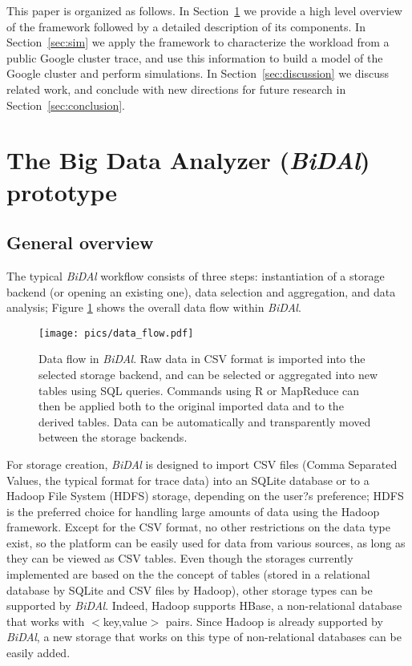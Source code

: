 \documentclass{article}
\begin{document}
This paper is organized as follows. In Section~\ref{sec:bidal} we provide a high level overview of the framework followed by a detailed description of its components. In Section~\ref{sec:sim} we apply the framework to characterize the workload from a public Google cluster trace, and use this information to build a model of the Google cluster and perform simulations. In Section~\ref{sec:discussion} we discuss related work, and conclude with new directions for future research in Section~\ref{sec:conclusion}.



\section{The Big Data Analyzer (\emph{BiDAl}) prototype}
\label{sec:bidal}

\subsection{General overview}

The typical \emph{BiDAl} workflow consists of three steps: instantiation of a storage backend (or opening an existing one), data selection and aggregation, and data analysis; Figure \ref{fig:data_flow} shows the overall data flow within \emph{BiDAl}. 

\begin{figure}[ht]
\centering
  \texttt{[image: pics/data\_flow.pdf]}
\caption{Data flow in \emph{BiDAl}. Raw data in CSV format is imported into the selected storage backend, and can be selected or aggregated into new tables using SQL queries. Commands using R or MapReduce can then be applied both to the original imported data and to the derived tables. Data can be automatically and transparently moved between the storage backends.}
\label{fig:data_flow}       
\end{figure}


For storage creation, \emph{BiDAl} is designed to import CSV files (Comma Separated Values, the typical format for trace data) into an SQLite database or to a Hadoop File System (HDFS) storage, depending on the user?s preference; HDFS is the preferred choice for handling large amounts of data using the Hadoop framework. Except for the CSV format, no other restrictions on the data type exist, so the platform can be easily used for data from various sources, as long as they can be viewed as CSV tables. Even though the storages currently implemented are based on the the concept of tables (stored in a relational database by SQLite and CSV files by Hadoop), other storage types can be supported by \emph{BiDAl}. Indeed, Hadoop supports HBase, a non-relational database that works with $<$key,value$>$ pairs. Since Hadoop is already supported by \emph{BiDAl}, a new storage that works on this type of non-relational databases can be easily added.
\end{document}
